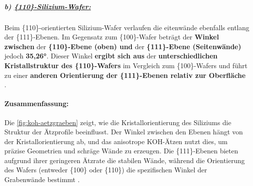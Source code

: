 \documentclass{article} %
\begin{document}
\subparagraph{b) \uline{\{110\}-Silizium-Wafer:}} Beim \{110\}-orientierten Silizium-Wafer verlaufen die eitenwände ebenfalls entlang der \{111\}-Ebenen. Im Gegensatz zum \{100\}-Wafer beträgt der \textbf{Winkel zwischen} der \textbf{\{110\}-Ebene (oben) und} der \textbf{\{111\}-Ebene (Seitenwände)} jedoch \textbf{35,26°}. Dieser Winkel \textbf{ergibt sich aus} der \textbf{unterschiedlichen Kristallstruktur des \{110\}-Wafers} im Vergleich zum \{100\}-Wafers und führt zu einer \textbf{anderen Orientierung der \{111\}-Ebenen relativ zur Oberfläche} \cite{seidel1990, kittel2004}.

\paragraph{Zusammenfassung:} Die \autoref{fig:koh-aetzgraeben} zeigt, wie die Kristallorientierung des Siliziums die Struktur der Ätzprofile beeinflusst. Der Winkel zwischen den Ebenen hängt von der Kristallorientierung ab, und das anisotrope KOH-Ätzen nutzt dies, um präzise Geometrien und schräge Wände zu erzeugen. Die \{111\}-Ebenen bieten aufgrund ihrer geringeren Ätzrate die stabilen Wände, während die Orientierung des Wafers (entweder \{100\} oder \{110\}) die spezifischen Winkel der Grabenwände bestimmt \cite{madou2002, seidel1990, kittel2004}.





\thispagestyle{empty}
\newpage
\end{document}
